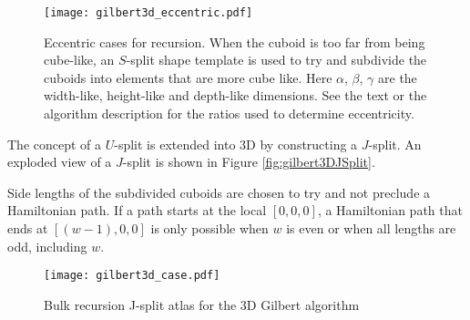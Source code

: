 \begin{figure}[h]
  \centering
  \texttt{[image: gilbert3d\_eccentric.pdf]}
  \caption{ Eccentric cases for recursion. When the cuboid is too far from being cube-like, an $S$-split shape template is used to try and subdivide the cuboids into elements that are more cube like. Here $\alpha$, $\beta$, $\gamma$ are the width-like, height-like and depth-like dimensions. See the text or the algorithm description for the ratios used to determine eccentricity. }
  \label{fig:gilbert3DEccentricCase}
\end{figure}


The concept of a $U$-split is extended into 3D by constructing a $J$-split.
An exploded view of a $J$-split is shown in Figure \ref{fig:gilbert3DJSplit}.

Side lengths of the subdivided cuboids are chosen to try and not preclude a
Hamiltonian path.
If a path starts at the local $[0,0,0]$, a Hamiltonian path that ends
at $[(w-1),0,0]$ is only possible when $w$ is even or when all lengths are odd, including $w$.


\begin{figure*}[ht]
  \centering
  \texttt{[image: gilbert3d\_case.pdf]}
  \caption{ Bulk recursion J-split atlas for the 3D Gilbert algorithm }
  \label{fig:gilbert3DCase}
\end{figure*}


